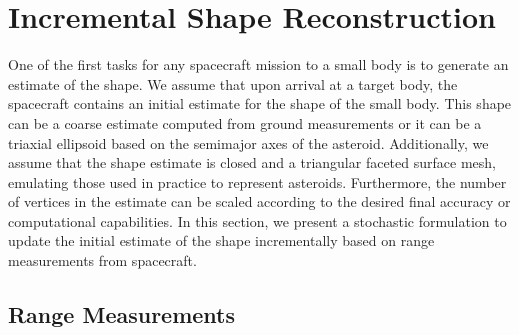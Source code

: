 \documentclass[journal]{new-aiaa}
\begin{document}
\section{Incremental Shape Reconstruction}\label{sec:radius_update}

One of the first tasks for any spacecraft mission to a small body is to generate an estimate of the shape.
We assume that upon arrival at a target body, the spacecraft contains an initial estimate for the shape of the small body.
This shape can be a coarse estimate computed from ground measurements or it can be a triaxial ellipsoid based on the semimajor axes of the asteroid.
Additionally, we assume that the shape estimate is closed and a triangular faceted surface mesh, emulating those used in practice to represent asteroids.
Furthermore, the number of vertices in the estimate can be scaled according to the desired final accuracy or computational capabilities.
In this section, we present a stochastic formulation to update the initial estimate of the shape incrementally based on range measurements from spacecraft. 

\subsection{Range Measurements}
\end{document}
